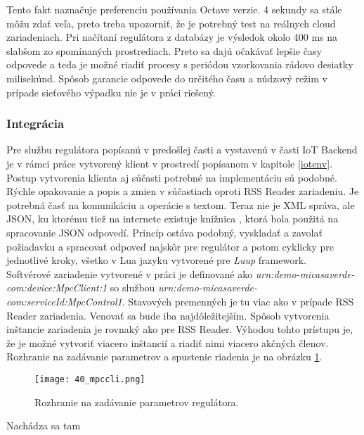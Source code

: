 Tento fakt naznačuje preferenciu používania Octave verzie. 4 sekundy sa stále môžu zdať veľa, preto treba upozorniť, že je potrebný test na reálnych cloud zariadeniach. Pri  načítaní regulátora z databázy je výsledok okolo 400 ms na slabšom zo spomínaných prostrediach. Preto sa dajú očakávať lepšie časy odpovede a teda je možné riadiť procesy s periódou vzorkovania rádovo desiatky milisekúnd. Spôsob garancie odpovede do určitého času a núdzový režim v prípade sieťového výpadku nie je v práci riešený.
\subsubsection{Integrácia} \label{integ}
Pre službu regulátora popísanú v predošlej časti a vystavenú v časti IoT Backend je v rámci práce vytvorený klient v prostredí popísanom v kapitole \ref{iotenv}. Postup vytvorenia klienta aj súčasti potrebné na implementáciu sú podobné. Rýchle opakovanie a popis a zmien v súčastiach oproti RSS Reader zariadeniu. Je potrebná časť na komunikáciu a operácie s textom. Teraz nie je XML správa, ale JSON, ku ktorému tiež na internete existuje knižnica \cite{IOT30}, ktorá bola použitá na spracovanie JSON odpovedí. Princíp ostáva podobný, vyskladať a zavolať požiadavku a spracovať odpoveď najskôr pre regulátor a potom cyklicky pre jednotlivé kroky, všetko v Lua jazyku vytvorené pre \textit{Luup} framework.\\
\indent Softvérové zariadenie vytvorené v práci je definované ako \textit{urn:demo-micasaverde-com:device:MpcClient:1} so službou \textit{urn:demo-micasaverde-com:serviceId:MpcControl1}. Stavových premenných je tu viac ako v prípade RSS Reader zariadenia. Venovať sa bude iba najdôležitejším. Spôsob vytvorenia inštancie zariadenia je rovnaký ako pre RSS Reader. Výhodou tohto prístupu je, že je možné vytvoriť viacero inštancií a riadiť nimi viacero akčných členov. Rozhranie na zadávanie parametrov a spustenie riadenia je na obrázku  \ref{40_mpccli}.
\begin{figure}[h]
\centering
\texttt{[image: 40\_mpccli.png]}
\caption{Rozhranie na zadávanie parametrov regulátora.}
\label{40_mpccli}
\end{figure} 
Nachádza sa tam
